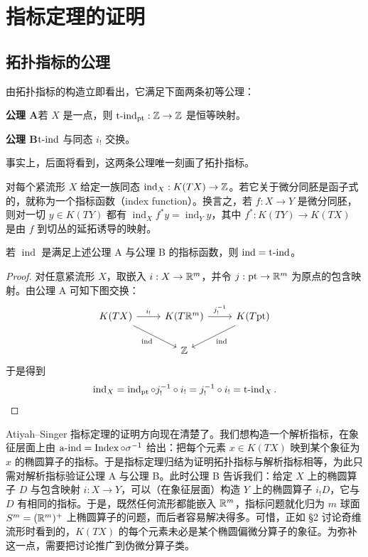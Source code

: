 \section{指标定理的证明}

\subsection{拓扑指标的公理}

由拓扑指标的构造立即看出，它满足下面两条初等公理：

\noindent\textbf{公理 A}\quad 若 $X$ 是一点，则 $\operatorname{t\text{-}ind}_{\mathrm{pt}}:\mathbb{Z}\to\mathbb{Z}$ 是恒等映射。

\noindent\textbf{公理 B}\quad $\operatorname{t\text{-}ind}$ 与同态 $i_!$ 交换。

事实上，后面将看到，这两条公理唯一刻画了拓扑指标。

\begin{definition}
对每个紧流形 $X$ 给定一族同态 $\operatorname{ind}_X:K(TX)\to\mathbb{Z}$。若它关于微分同胚是函子式的，就称为一个指标函数（index function）。换言之，若 $f:X\to Y$ 是微分同胚，则对一切 $y\in K(TY)$ 都有 $\operatorname{ind}_Xf^*y=\operatorname{ind}_Yy$，其中 $f^*:K(TY)\to K(TX)$ 是由 $f$ 到切丛的延拓诱导的映射。
\end{definition}

\begin{proposition}
若 $\operatorname{ind}$ 是满足上述公理 A 与公理 B 的指标函数，则 $\operatorname{ind}=\operatorname{t\text{-}ind}$。
\end{proposition}

\begin{proof}
对任意紧流形 $X$，取嵌入 $i:X\to\mathbb{R}^m$，并令 $j:\mathrm{pt}\to\mathbb{R}^m$ 为原点的包含映射。由公理 A 可知下图交换：
\[
\begin{tikzcd}
K(TX) \arrow[r,"i_!"] \arrow[dr,"\operatorname{ind}"']
  & K(T\R^m) \arrow[r,"j_!^{-1}"] & K(T\pt) \arrow[dl,"\operatorname{ind}"] \\
& \Z & {}
\end{tikzcd}
\]
于是得到
\[
\operatorname{ind}_X=\operatorname{ind}_{\mathrm{pt}}\circ j_!^{-1}\circ i_!
=j_!^{-1}\circ i_!=\operatorname{t\text{-}ind}_X.
\]
\end{proof}


Atiyah--Singer 指标定理的证明方向现在清楚了。我们想构造一个解析指标，在象征层面上由 $\operatorname{a\text{-}ind}=\operatorname{Index}\circ\sigma^{-1}$ 给出：把每个元素 $x\in K(TX)$ 映到某个象征为 $x$ 的椭圆算子的指标。于是指标定理归结为证明拓扑指标与解析指标相等，为此只需对解析指标验证公理 A 与公理 B。此时公理 B 告诉我们：给定 $X$ 上的椭圆算子 $D$ 与包含映射 $i:X\to Y$，可以（在象征层面）构造
$Y$ 上的椭圆算子 $i_!D$，它与 $D$ 有相同的指标。于是，既然任何流形都能嵌入 $\mathbb{R}^m$，指标问题就化归为 $m$ 球面 $S^m=(\mathbb{R}^m)^+$ 上椭圆算子的问题，而后者容易解决得多。可惜，正如 §2 讨论奇维流形时看到的，$K(TX)$ 的每个元素未必是某个椭圆偏微分算子的象征。为弥补这一点，需要把讨论推广到伪微分算子类。

